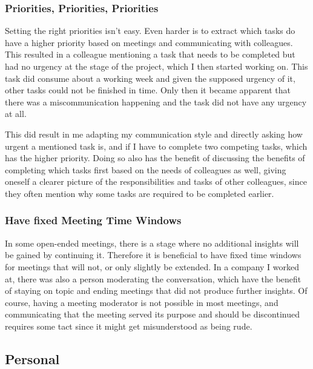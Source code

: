         \subsubsection{Priorities, Priorities, Priorities}

            Setting the right priorities isn't easy.
            Even harder is to extract which tasks do have a higher priority based on meetings and communicating with colleagues.
            This resulted in a colleague mentioning a task that needs to be completed but had no urgency at the stage of the project, which I then started working on.
            This task did consume about a working week and given the supposed urgency of it, other tasks could not be finished in time.
            Only then it became apparent that there was a miscommunication happening and the task did not have any urgency at all.

            This did result in me adapting my communication style and directly asking how urgent a mentioned task is, and if I have to complete two competing tasks, which has the higher priority.
            Doing so also has the benefit of discussing the benefits of completing which tasks first based on the needs of colleagues as well, giving oneself a clearer picture of the responsibilities and tasks of other colleagues, since they often mention why some tasks are required to be completed earlier.

        \subsubsection{Have fixed Meeting Time Windows}
        \label{sec:have-fixed-meeting-times}

            In some open-ended meetings, there is a stage where no additional insights will be gained by continuing it. Therefore it is beneficial to have fixed time windows for meetings that will not, or only slightly be extended.
            In a company I worked at, there was also a person moderating the conversation, which have the benefit of staying on topic and ending meetings that did not produce further insights. Of course, having a meeting moderator is not possible in most meetings, and communicating that the meeting served its purpose and should be discontinued requires some tact since it might get misunderstood as being rude.
    
    \subsection{Personal}

